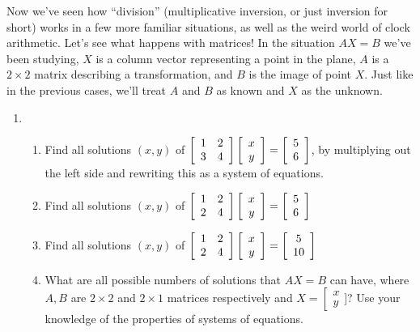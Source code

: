 \documentclass[../gatm.tex]{subfiles}
\begin{document}
Now we've seen how ``division'' (multiplicative inversion, or just inversion for short) works in a few more familiar situations, as well as the weird world of clock arithmetic. Let's see what happens with matrices! In the situation $AX=B$ we've been studying, $X$ is a column vector representing a point in the plane, $A$ is a $2\times 2$ matrix describing a transformation, and $B$ is the image of point $X$. Just like in the previous cases, we'll treat $A$ and $B$ as known and $X$ as the unknown.

\begin{enumerate}
\setcounter{enumi}{\value{problem_i}}
\item \begin{enumerate}
\item \label{prob:needed_for_matrix_undo3}Find all solutions $(x,y)$ of $\left[\begin{array}{cc} 1 & 2 \\ 3 & 4 \end{array}\right]\left[\begin{array}{c} x \\ y \end{array}\right]=\left[\begin{array}{c} 5 \\ 6 \end{array}\right]$, by multiplying out the left side and rewriting this as a system of equations.
\item \label{prob:needed_for_matrix_undo4}Find all solutions $(x,y)$ of $\left[\begin{array}{cc} 1 & 2 \\ 2 & 4 \end{array}\right]\left[\begin{array}{c} x \\ y \end{array}\right]=\left[\begin{array}{c} 5 \\ 6 \end{array}\right]$
\item Find all solutions $(x,y)$ of $\left[\begin{array}{cc} 1 & 2 \\ 2 & 4 \end{array}\right]\left[\begin{array}{c} x \\ y \end{array}\right]=\left[\begin{array}{c} 5 \\ 10 \end{array}\right]$
\item What are all possible numbers of solutions that $AX=B$ can have, where $A,B$ are $2\times 2$ and $2\times 1$ matrices respectively and $X=\left[\begin{smallmatrix} x \\ y \end{smallmatrix}]$? Use your knowledge of the properties of systems of equations.

\end{enumerate}
\end{enumerate}
\end{document}
